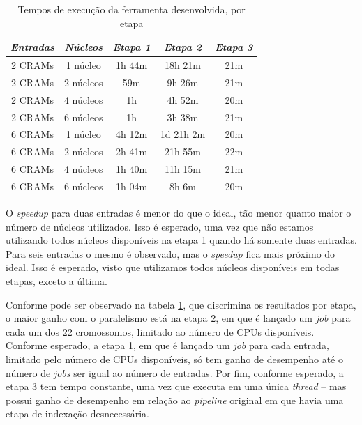 \documentclass[cic,tc]{iiufrgs}
\begin{document}
\begin{table}[h]
    \caption{Tempos de execução da ferramenta desenvolvida, por etapa}
    \centering
        \begin{tabular}{c|c|c|c|c}
          \hline
          \textit{Entradas}  & \textit{Núcleos} & \textit{Etapa 1}  & \textit{Etapa 2} & \textit{Etapa 3} \\
          \hline
          \hline
          2 CRAMs & 1 núcleo  & 1h 44m &    18h 21m & 21m \\
          2 CRAMs & 2 núcleos &    59m &     9h 26m & 21m \\
          2 CRAMs & 4 núcleos & 1h     &     4h 52m & 20m \\
          2 CRAMs & 6 núcleos & 1h     &     3h 38m & 21m \\
          6 CRAMs & 1 núcleo  & 4h 12m & 1d 21h  2m & 20m \\
          6 CRAMs & 2 núcleos & 2h 41m &    21h 55m & 22m \\
          6 CRAMs & 4 núcleos & 1h 40m &    11h 15m & 21m \\
          6 CRAMs & 6 núcleos & 1h 04m &     8h  6m & 20m \\
          \hline
        \end{tabular}
    \label{tbl:stages}
\end{table}

O \textit{speedup} para duas entradas é menor do que o ideal, tão menor quanto
maior o número de núcleos utilizados. Isso é esperado, uma vez que não estamos
utilizando todos núcleos disponíveis na etapa 1 quando há somente duas
entradas. Para seis entradas o mesmo é observado, mas o \textit{speedup} fica
mais próximo do ideal. Isso é esperado, visto que utilizamos todos núcleos
disponíveis em todas etapas, exceto a última.

Conforme pode ser observado na tabela \ref{tbl:stages}, que discrimina os
resultados por etapa, o maior ganho com o paralelismo está na etapa 2, em que é
lançado um \textit{job} para cada um dos 22 cromossomos, limitado ao número de
CPUs disponíveis. Conforme esperado, a etapa 1, em que é lançado um
\textit{job} para cada entrada, limitado pelo número de CPUs disponíveis, só
tem ganho de desempenho até o número de \textit{jobs} ser igual ao número de
entradas. Por fim, conforme esperado, a etapa 3 tem tempo constante, uma vez
que executa em uma única \textit{thread} -- mas possui ganho de desempenho em relação ao
\textit{pipeline} original em que havia uma etapa de indexação desnecessária.
\end{document}
